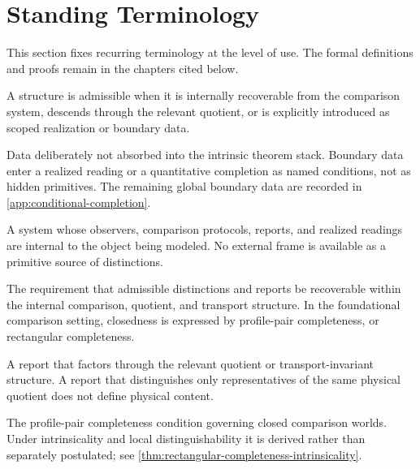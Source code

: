 \chapter*{Standing Terminology}
{}
\label{ch:standing-terminology}
This section fixes recurring terminology at the level of use.  The
formal definitions and proofs remain in the chapters cited below.

\begin{description}[leftmargin=3.6cm,style=nextline]
\item[Admissible]
A structure is admissible when it is internally recoverable from the
comparison system, descends through the relevant quotient, or is
explicitly introduced as scoped realization or boundary data.

\item[Boundary data]
Data deliberately not absorbed into the intrinsic theorem stack.  Boundary
data enter a realized reading or a quantitative completion as named
conditions, not as hidden primitives.  The remaining global boundary data
are recorded in \cref{app:conditional-completion}.

\item[Closed world]
A system whose observers, comparison protocols, reports, and realized
readings are internal to the object being modeled.  No external frame is
available as a primitive source of distinctions.

\item[Closure]
The requirement that admissible distinctions and reports be recoverable
within the internal comparison, quotient, and transport structure.  In
the foundational comparison setting, closedness is expressed by
profile-pair completeness, or rectangular completeness.

\item[Coherent report]
A report that factors through the relevant quotient or transport-invariant
structure.  A report that distinguishes only representatives of the same
physical quotient does not define physical content.

\item[Comparison completeness]
The profile-pair completeness condition governing closed comparison
worlds.  Under intrinsicality and local distinguishability it is derived
rather than separately postulated; see
\cref{thm:rectangular-completeness-intrinsicality}.


\end{description}
